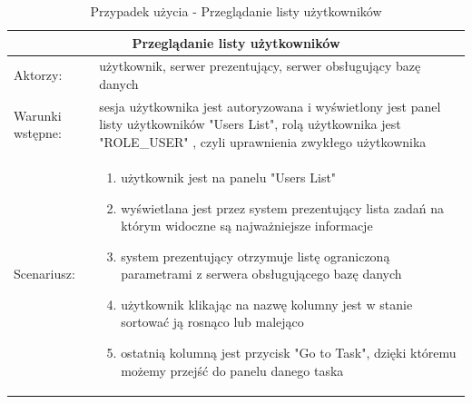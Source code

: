 \begin{table}[h!]
	\begin{tabular}{|p{2cm}||p{13cm}|  }
		
		\hline
		\multicolumn{2}{|c|}{Przeglądanie listy użytkowników} \\
		\hline
		Aktorzy: &użytkownik, serwer prezentujący, serwer obsługujący bazę danych\\
		\hline
		Warunki wstępne: &sesja użytkownika jest autoryzowana i wyświetlony jest panel listy użytkowników  "Users List", rolą użytkownika jest "ROLE\_USER" , czyli uprawnienia zwykłego użytkownika\\
		\hline
		Scenariusz: &
		\begin{enumerate}
			\item użytkownik jest na panelu "Users List"
			\item wyświetlana jest przez system prezentujący lista zadań na którym widoczne są najważniejsze informacje
			\item system prezentujący otrzymuje listę ograniczoną parametrami z serwera obsługującego bazę danych
			\item użytkownik klikając na nazwę kolumny jest w stanie sortować ją rosnąco lub malejąco
			\item ostatnią kolumną jest przycisk "Go to Task", dzięki któremu możemy przejść do panelu danego taska
		\end{enumerate}\\
		\hline
	\end{tabular}
	\caption{Przypadek użycia - Przeglądanie listy użytkowników}
\end{table}



